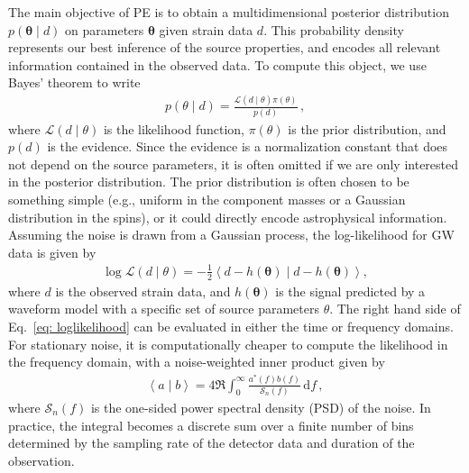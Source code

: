\documentclass[twocolumn]{aastex631}
\begin{document}
The main objective of PE is to obtain a multidimensional posterior distribution
$p(\mathbf{\theta} \mid d)$ on parameters $\mathbf{\theta}$ given strain
data $d$.  This probability density represents our best inference of
the source properties, and encodes all relevant information contained in the
observed data.
To compute this object, we use Bayes' theorem to write
\begin{align} \label{eq: bayes}
    p(\theta \mid d) = \frac{\mathcal{L}(d \mid \theta)\pi(\theta)}{p(d)}\, ,
\end{align}
where $\mathcal{L}(d \mid \theta)$ is the likelihood function, $\pi(\theta)$ is
the prior distribution, and $p(d)$ is the evidence. Since the evidence is a
normalization constant that does not depend on the source parameters, it is
often omitted if we are only interested in the posterior distribution. The prior
distribution is often chosen to be something simple (e.g., uniform in the component masses or a Gaussian distribution in the spins), or
it could directly encode astrophysical information. Assuming the noise is drawn from a
Gaussian process, the log-likelihood for GW data is given by
\begin{align}
    \log{\mathcal{L}(d \mid \theta)} = -\frac{1}{2} \left\langle d-h(\mathbf{\theta}) \mid d-h(\mathbf{\theta})\right\rangle,
\label{eq: loglikelihood}
\end{align}
where $d$ is the observed strain data, and $h(\mathbf{\theta})$ is the signal
predicted by a waveform model with a specific set of source parameters
$\theta$.  The right hand side of Eq.~\eqref{eq: loglikelihood} can be
evaluated in either the time or frequency domains. For stationary noise, it is
computationally cheaper to compute the likelihood in the frequency domain, with
a noise-weighted inner product given by
\begin{align}
    \left\langle a \mid b\right\rangle = 4 \Re \int_0^\infty \frac{a^*(f)b(f)}{\mathcal{S}_n(f)}\, \mathrm{d}f \, ,
\label{eq: innerproduct}
\end{align}
where $\mathcal{S}_n(f)$ is the one-sided power spectral density (PSD) of the
noise.  In practice, the integral becomes a discrete sum over a finite number
of bins determined by the sampling rate of the detector data and duration of
the observation.
\end{document}
